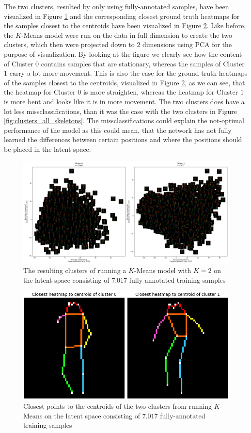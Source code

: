 \documentclass[./main.tex]{subfiles}
\begin{document}
The two clusters, resulted by only using fully-annotated samples, have been visualized in Figure \ref{fig:clusters_full_skeletons} and the corresponding closest ground truth heatmaps for the samples closest to the centroids have been visualized in Figure \ref{fig:centroids_full}. Like before, the $K$-Means model were run on the data in full dimension to create the two clusters, which then were projected down to $2$ dimensions using PCA for the purpose of visualization. By looking at the figure we clearly see how the content of Cluster $0$ contains samples that are stationary, whereas the samples of Cluster $1$ carry a lot more movement. This is also the case for the ground truth heatmaps of the samples closest to the centroids, visualized in Figure \ref{fig:centroids_full}, as we can see, that the heatmap for Cluster $0$ is more straighten, whereas the heatmap for Cluster $1$ is more bent and looks like it is in more movement. The two clusters does have a lot less missclassifications, than it was the case with the two clusters in Figure \ref{fig:clusters_all_skeletons}. The missclassifications could explain the not-optimal performance of the model as this could mean, that the network has not fully learned the differences between certain positions and where the positions should be placed in the latent space.
\begin{figure}[htbp]
    \centering
    \includegraphics[width = \textwidth]{entities/cluster_full_skeletons.png}
    \caption{The resulting clusters of running a $K$-Means model with $K = 2$ on the latent space consisting of $7.017$ fully-annotated training samples}
    \label{fig:clusters_full_skeletons}
\end{figure}
\begin{figure}[b]
    \centering
    \includegraphics[height = 4 cm]{entities/centroids_full_skeletons.png}
    \caption{Closest points to the centroids of the two clusters from running $K$-Means on the latent space consisting of $7.017$ fully-annotated training samples}
    \label{fig:centroids_full}
\end{figure}
\end{document}
